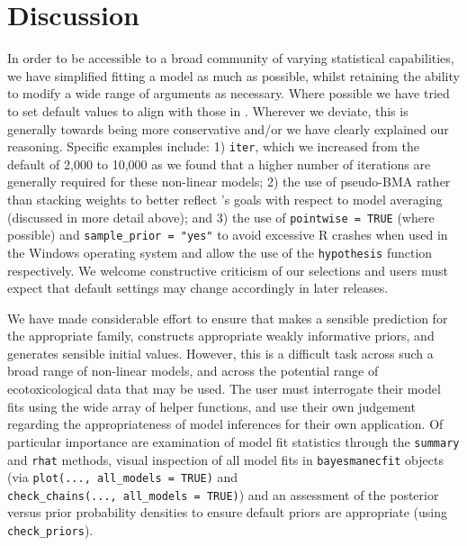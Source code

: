 \documentclass[
]{jss}
\begin{document}
\hypertarget{discussion}{%
\section{Discussion}\label{discussion}}

In order to be accessible to a broad community of varying statistical
capabilities, we have simplified fitting a  model as much
as possible, whilst retaining the ability to modify a wide range of
arguments as necessary. Where possible we have tried to set default
values to align with those in . Wherever we deviate, this is
generally towards being more conservative and/or we have clearly
explained our reasoning. Specific examples include: 1) \texttt{iter},
which we increased from the  default of 2,000 to 10,000 as we
found that a higher number of iterations are generally required for
these non-linear models; 2) the use of pseudo-BMA rather than stacking
weights to better reflect 's goals with respect to model
averaging (discussed in more detail above); and 3) the use of
\texttt{pointwise\ =\ TRUE} (where possible) and
\texttt{sample\_prior\ =\ "yes"} to avoid excessive R crashes when used
in the Windows operating system and allow the use of the
\texttt{hypothesis} function respectively. We welcome constructive
criticism of our selections and users must expect that default settings
may change accordingly in later releases.

We have made considerable effort to ensure that  makes a
sensible prediction for the appropriate family, constructs appropriate
weakly informative priors, and generates sensible initial values.
However, this is a difficult task across such a broad range of
non-linear models, and across the potential range of ecotoxicological
data that may be used. The user must interrogate their model fits using
the wide array of helper functions, and use their own judgement
regarding the appropriateness of model inferences for their own
application. Of particular importance are examination of model fit
statistics through the \texttt{summary} and \texttt{rhat} methods,
visual inspection of all model fits in \texttt{bayesmanecfit} objects
(via \texttt{plot(...,\ all\_models\ =\ TRUE)} and
\texttt{check\_chains(...,\ all\_models\ =\ TRUE)}) and an assessment of
the posterior versus prior probability densities to ensure default
priors are appropriate (using \texttt{check\_priors}).
\end{document}
